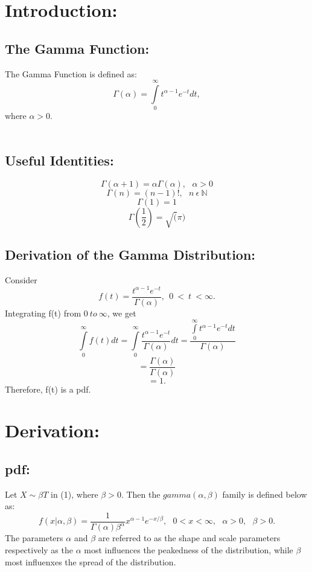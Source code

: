 \documentclass{article}
\begin{document}
\section*{Introduction:}

  \subsection*{The Gamma Function:}
    The Gamma Function is defined as:
    \[
      \Gamma (\alpha) = \int\limits_0^\infty {t^{\alpha - 1} e^{-t} dt},
    \]
    where $\alpha > 0$.\\\\
   \subsection*{ Useful Identities:}
    \[
      \Gamma(\alpha+1) = \alpha\Gamma(\alpha), ~~~\alpha > 0
    \]
    \[
      \Gamma(n) = (n-1)!, ~~~ n ~ \epsilon ~ \mathbb{N}
    \]
    \[
      \Gamma(1) = 1
    \]
    \[
      \Gamma(\frac{1}{2}) = \sqrt(\pi)
    \]
  \subsection*{Derivation of the Gamma Distribution:}
     Consider
     \[
        f(t) = \frac{t^{\alpha-1} e^{-t}}{\Gamma(\alpha)},~~0~<~t~<\infty.
     \] 
     Integrating f(t) from $0~to~\infty$, we get
     \[
        \int\limits_0^\infty {f(t) dt} = 
        \int\limits_0^\infty {\frac{t^{\alpha - 1} e^{-t}}{\Gamma(\alpha)} dt} =
        \frac{\int\limits_0^\infty {t^{\alpha - 1} e^{-t}} dt}{\Gamma(\alpha)}
     \]
     \[
        = \frac{\Gamma(\alpha)}{\Gamma(\alpha)}
     \]
     \begin{equation} 
        = 1.
     \end{equation}
     Therefore, f(t) is a pdf. 

\section*{Derivation:}

  \subsection*{pdf:}
  Let $X \sim \beta T $ in (1), where $\beta > 0$. Then the $ gamma(\alpha,\beta) $ family is defined below as:
  \[
    f(x|\alpha,\beta) = \frac{1}{\Gamma(\alpha)\beta^\alpha}x^{\alpha-1}e^{-x/\beta}, ~~~ 0<x<\infty,~~~\alpha>0,~~~\beta>0.
  \]
  The parameters $\alpha$ and $\beta$ are referred to as the shape and scale parameters respectively as the $\alpha$ most influences the peakedness of the distribution, while $\beta$ most influenxes the spread of the distribution.
\end{document}
